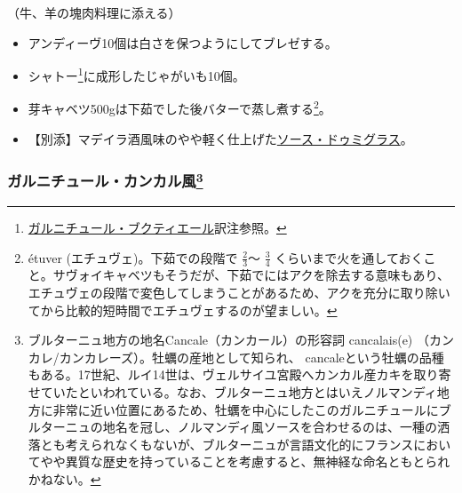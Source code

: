\begin{recette}

（牛、羊の塊肉料理に添える）

\begin{itemize}
\item
  アンディーヴ10個は白さを保つようにしてブレゼする。
\item
  シャトー\footnote{\protect\hyperlink{garniture-bouquetiere}{ガルニチュール・ブクティエール}訳注参照。}に成形したじゃがいも10個。
\item
  芽キャベツ500gは下茹でした後バターで蒸し煮する\footnote{étuver
    (エチュヴェ)。下茹での段階で \(\frac{2}{3}\)〜 \(\frac{3}{4}\)
    くらいまで火を通しておくこと。サヴォイキャベツもそうだが、下茹でにはアクを除去する意味もあり、エチュヴェの段階で変色してしまうことがあるため、アクを充分に取り除いてから比較的短時間でエチュヴェするのが望ましい。}。
\item
  【別添】マデイラ酒風味のやや軽く仕上げた\protect\hyperlink{sauce-demi-glace}{ソース・ドゥミグラス}。
\end{itemize}

\atoaki{}

\hypertarget{garniture-cancalaise}{%
\subsubsection[ガルニチュール・カンカル風]{\texorpdfstring{ガルニチュール・カンカル風\footnote{ブルターニュ地方の地名Cancale（カンカール）の形容詞
  cancalais(e) （カンカレ/カンカレーズ）。牡蠣の産地として知られ、
  cancaleという牡蠣の品種もある。17世紀、ルイ14世は、ヴェルサイユ宮殿へカンカル産カキを取り寄せていたといわれている。なお、ブルターニュ地方とはいえノルマンディ地方に非常に近い位置にあるため、牡蠣を中心にしたこのガルニチュールにブルターニュの地名を冠し、ノルマンディ風ソースを合わせるのは、一種の洒落とも考えられなくもないが、ブルターニュが言語文化的にフランスにおいてやや異質な歴史を持っていることを考慮すると、無神経な命名ともとられかねない。}}{ガルニチュール・カンカル風}}\label{garniture-cancalaise}}




\end{recette}
